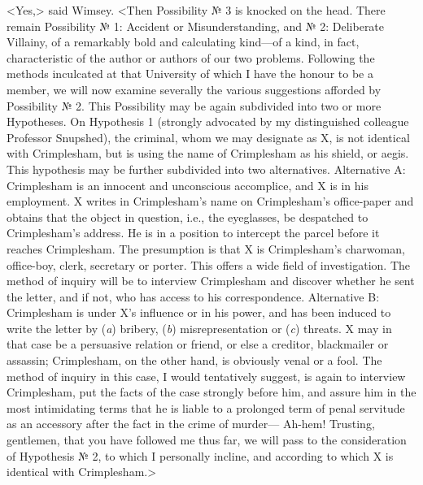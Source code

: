 <Yes,> said Wimsey. <Then Possibility № 3 is knocked on the head. There remain Possibility № 1: Accident or Misunderstanding, and № 2: Deliberate Villainy, of a remarkably bold and calculating kind—of a kind, in fact, characteristic of the author or authors of our two problems. Following the methods inculcated at that University of which I have the honour to be a member, we will now examine severally the various suggestions afforded by Possibility № 2. This Possibility may be again subdivided into two or more Hypotheses. On Hypothesis 1 (strongly advocated by my distinguished colleague Professor Snupshed), the criminal, whom we may designate as X\@, is not identical with Crimplesham, but is using the name of Crimplesham as his shield, or aegis. This hypothesis may be further subdivided into two alternatives. Alternative A\@: Crimplesham is an innocent and unconscious accomplice, and X is in his employment. X writes in Crimplesham's name on Crimplesham's office-paper and obtains that the object in question, i.e., the eyeglasses, be despatched to Crimplesham's address. He is in a position to intercept the parcel before it reaches Crimplesham. The presumption is that X is Crimplesham's charwoman, office-boy, clerk, secretary or porter. This offers a wide field of investigation. The method of inquiry will be to interview Crimplesham and discover whether he sent the letter, and if not, who has access to his correspondence. Alternative B\@: Crimplesham is under X's influence or in his power, and has been induced to write the letter by (\textit{a}) bribery, (\textit{b}) misrepresentation or (\textit{c}) threats. X may in that case be a persuasive relation or friend, or else a creditor, blackmailer or assassin; Crimplesham, on the other hand, is obviously venal or a fool. The method of inquiry in this case, I would tentatively suggest, is again to interview Crimplesham, put the facts of the case strongly before him, and assure him in the most intimidating terms that he is liable to a prolonged term of penal servitude as an accessory after the fact in the crime of murder— Ah-hem! Trusting, gentlemen, that you have followed me thus far, we will pass to the consideration of Hypothesis № 2, to which I personally incline, and according to which X is identical with Crimplesham.>

